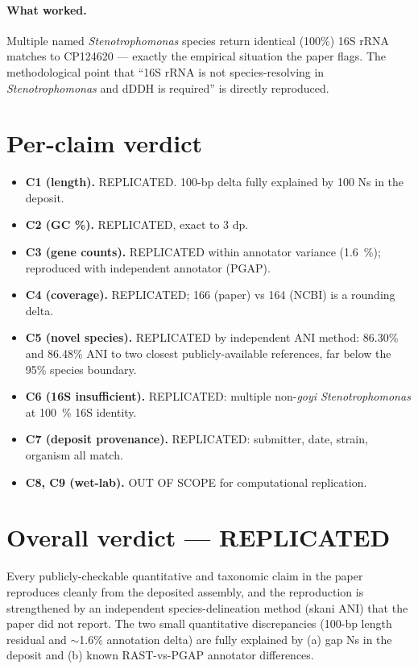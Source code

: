 \documentclass[11pt]{article}
\begin{document}
\paragraph{What worked.} Multiple named \emph{Stenotrophomonas} species return
identical (100\%) 16S rRNA matches to CP124620 --- exactly the empirical situation the
paper flags. The methodological point that ``16S rRNA is not species-resolving in
\emph{Stenotrophomonas} and dDDH is required'' is directly reproduced.

\section{Per-claim verdict}
\begin{itemize}
\item \textbf{C1 (length).} REPLICATED. 100-bp delta fully explained by 100 Ns in the deposit.
\item \textbf{C2 (GC \%).} REPLICATED, exact to 3 dp.
\item \textbf{C3 (gene counts).} REPLICATED within annotator variance (1.6~\%); reproduced with independent annotator (PGAP).
\item \textbf{C4 (coverage).} REPLICATED; 166 (paper) vs 164 (NCBI) is a rounding delta.
\item \textbf{C5 (novel species).} REPLICATED by independent ANI method: 86.30\% and 86.48\% ANI to two closest publicly-available references, far below the 95\% species boundary.
\item \textbf{C6 (16S insufficient).} REPLICATED: multiple non-\emph{goyi Stenotrophomonas} at 100~\% 16S identity.
\item \textbf{C7 (deposit provenance).} REPLICATED: submitter, date, strain, organism all match.
\item \textbf{C8, C9 (wet-lab).} OUT OF SCOPE for computational replication.
\end{itemize}

\section{Overall verdict --- REPLICATED}

Every publicly-checkable quantitative and taxonomic claim in the paper reproduces
cleanly from the deposited assembly, and the reproduction is strengthened by an
independent species-delineation method (skani ANI) that the paper did not report.
The two small quantitative discrepancies (100-bp length residual and $\sim$1.6\%
annotation delta) are fully explained by (a) gap Ns in the deposit and (b) known
RAST-vs-PGAP annotator differences.
\end{document}
